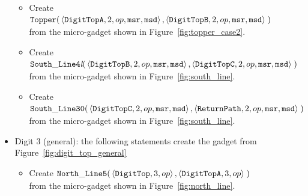 \begin{itemize}
\begin{itemize}
            \item Create
            $\begin{aligned}[t]
                {\tt Topper}(& \left\langle {\tt DigitTopA}, 2, op, {\tt msr}, {\tt msd} \right\rangle,
                               \left\langle {\tt DigitTopB}, 2, op, {\tt msr}, {\tt msd} \right\rangle \;)
            \end{aligned}$\\from the micro-gadget shown in Figure~\ref{fig:topper_case2}.

            \item Create
            $\begin{aligned}[t]
                {\tt South\_Line4\textit{l}}(& \left\langle {\tt DigitTopB}, 2, op, {\tt msr}, {\tt msd} \right\rangle,
                                               \left\langle {\tt DigitTopC}, 2, op, {\tt msr}, {\tt msd} \right\rangle \;)
            \end{aligned}$\\from the micro-gadget shown in Figure~\ref{fig:south_line}.

            \item Create
            $\begin{aligned}[t]
                {\tt South\_Line30}(& \left\langle {\tt DigitTopC}, 2, op, {\tt msr}, {\tt msd} \right\rangle,
                                      \left\langle {\tt ReturnPath},     2, op, {\tt msr}, {\tt msd}\right\rangle \;)
            \end{aligned}$\\from the micro-gadget shown in Figure~\ref{fig:south_line}.
        \end{itemize}
        \vspace{1cm}


        \item Digit 3 (general): the following statements create the gadget from Figure~\ref{fig:digit_top_general}
        \begin{itemize}
            \item Create
            $\begin{aligned}[t]
                {\tt North\_Line5}(& \left\langle {\tt DigitTop},  3, op \right\rangle,
                                     \left\langle {\tt DigitTopA}, 3, op \right\rangle \;)
            \end{aligned}$\\from the micro-gadget shown in Figure~\ref{fig:north_line}.


\end{itemize}
\end{itemize}
